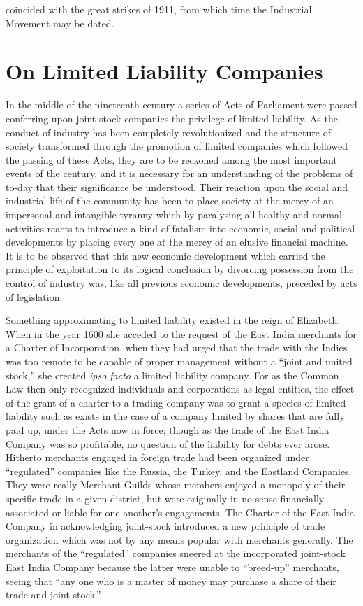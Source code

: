 \documentclass{book}
\begin{document}
coincided with the great strikes of 1911, from which time the Industrial Movement may be dated.

\chapter{On Limited Liability Companies}
\label{chapter-18}
In the middle of the nineteenth century a series of Acts of Parliament were passed conferring upon joint-stock companies the privilege of limited liability. As the conduct of industry has been completely revolutionized and the structure of society transformed through the promotion of limited companies which followed the passing of these Acts, they are to be reckoned among the most important events of the century, and it is necessary for an understanding of the problems of to-day that their significance be understood. Their reaction upon the social and industrial life of the community has been to place society at the mercy of an impersonal and intangible tyranny which by paralysing all healthy and normal activities reacts to introduce a kind of fatalism into economic, social and political developments by placing every one at the mercy of an elusive financial machine. It is to be observed that this new economic development which carried the principle of exploitation to its logical conclusion by divorcing possession from the control of industry was, like all previous economic developments, preceded by acts of legislation.

Something approximating to limited liability existed in the reign of Elizabeth. When in the year 1600 she acceded to the request of the East India merchants for a Charter of Incorporation, when they had urged that the trade with the Indies was too remote to be capable of proper management without a “joint and united stock,” she created \emph{ipso facto} a limited liability company. For as the Common Law then only recognized individuals and corporations as legal entities, the effect of the grant of a charter to a trading company was to grant a species of limited liability such as exists in the case of a company limited by shares that are fully paid up, under the Acts now in force; though as the trade of the East India Company was so profitable, no question of the liability for debts ever arose. Hitherto merchants engaged in foreign trade had been organized under “regulated” companies like the Russia, the Turkey, and the Eastland Companies. They were really Merchant Guilds whose members enjoyed a monopoly of their specific trade in a given district, but were originally in no sense financially associated or liable for one another’s engagements. The Charter of the East India Company in acknowledging joint-stock introduced a new principle of trade organization which was not by any means popular with merchants generally. The merchants of the “regulated” companies sneered at the incorporated joint-stock East India Company because the latter were unable to “breed-up” merchants, seeing that “any one who is a master of money may purchase a share of their trade and joint-stock.”
\end{document}

